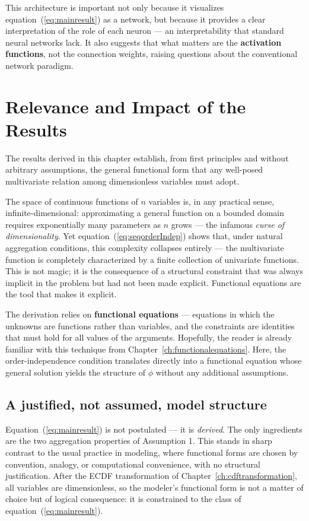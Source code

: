 This architecture is important not only because it visualizes equation~(\ref{eq:mainresult})
as a network, but because it provides a clear interpretation of the role of each neuron
— an interpretability that standard neural networks lack. It also suggests that what
matters are the \textbf{activation functions}, not the connection weights, raising
questions about the conventional network paradigm.


\section{Relevance and Impact of the Results}

The results derived in this chapter establish, from first principles and without
arbitrary assumptions, the general functional form that any well-posed multivariate
relation among dimensionless variables must adopt.

The space of continuous functions of $n$ variables is, in any practical sense,
infinite-dimensional: approximating a general function on a bounded domain requires
exponentially many parameters as $n$ grows — the infamous \emph{curse of
dimensionality}. Yet equation~(\ref{eq:seqorderIndep}) shows that, under natural
aggregation conditions, this complexity collapses entirely — the multivariate function
is completely characterized by a finite collection of univariate functions.
This is not magic; it is the consequence of a structural constraint that was always
implicit in the problem but had not been made explicit. Functional equations are the
tool that makes it explicit.

The derivation relies on \textbf{functional equations} — equations in which the unknowns
are functions rather than variables, and the constraints are identities that must hold
for all values of the arguments. Hopefully, the reader is already familiar with this
technique from Chapter~\ref{ch:functionalequations}. Here, the order-independence
condition translates directly into a functional equation whose general solution yields
the structure of $\phi$ without any additional assumptions.


\subsection{A justified, not assumed, model structure}

Equation~(\ref{eq:mainresult}) is not postulated — it is \emph{derived}. The only
ingredients are the two aggregation properties of Assumption 1. This stands in sharp
contrast to the usual practice in modeling, where functional forms are chosen by
convention, analogy, or computational convenience, with no structural justification.
After the ECDF transformation of Chapter~\ref{ch:cdftransformation}, all variables
are dimensionless, so the modeler's functional form is not a matter of choice but of
logical consequence: it is constrained to the class of equation~(\ref{eq:mainresult}).

